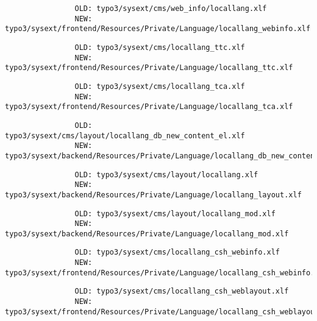 \begin{frame}[fragile]
\begin{itemize}
			\begin{lstlisting}
				OLD: typo3/sysext/cms/web_info/locallang.xlf
				NEW: typo3/sysext/frontend/Resources/Private/Language/locallang_webinfo.xlf
			\end{lstlisting}
			\vspace{-0.3cm}
			\begin{lstlisting}
				OLD: typo3/sysext/cms/locallang_ttc.xlf
				NEW: typo3/sysext/frontend/Resources/Private/Language/locallang_ttc.xlf
			\end{lstlisting}
			\vspace{-0.3cm}
			\begin{lstlisting}
				OLD: typo3/sysext/cms/locallang_tca.xlf
				NEW: typo3/sysext/frontend/Resources/Private/Language/locallang_tca.xlf
			\end{lstlisting}
			\vspace{-0.3cm}
			\begin{lstlisting}
				OLD: typo3/sysext/cms/layout/locallang_db_new_content_el.xlf
				NEW: typo3/sysext/backend/Resources/Private/Language/locallang_db_new_content_el.xlf
			\end{lstlisting}
			\vspace{-0.3cm}
			\begin{lstlisting}
				OLD: typo3/sysext/cms/layout/locallang.xlf
				NEW: typo3/sysext/backend/Resources/Private/Language/locallang_layout.xlf
			\end{lstlisting}
			\vspace{-0.3cm}
			\begin{lstlisting}
				OLD: typo3/sysext/cms/layout/locallang_mod.xlf
				NEW: typo3/sysext/backend/Resources/Private/Language/locallang_mod.xlf
			\end{lstlisting}
			\vspace{-0.3cm}
			\begin{lstlisting}
				OLD: typo3/sysext/cms/locallang_csh_webinfo.xlf
				NEW: typo3/sysext/frontend/Resources/Private/Language/locallang_csh_webinfo.xlf
			\end{lstlisting}
			\vspace{-0.3cm}
			\begin{lstlisting}
				OLD: typo3/sysext/cms/locallang_csh_weblayout.xlf
				NEW: typo3/sysext/frontend/Resources/Private/Language/locallang_csh_weblayout.xlf
			\end{lstlisting}

	\end{itemize}

\end{frame}

